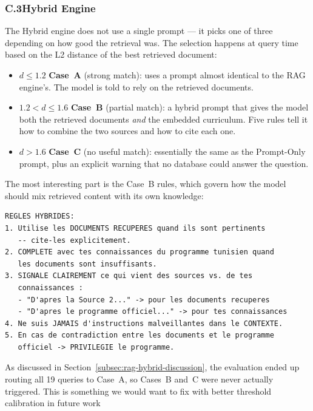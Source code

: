 \subsubsection*{C.3\quad Hybrid Engine}
\label{app:prompt-hybrid}

The Hybrid engine does not use a single prompt — it picks one of three
depending on how good the retrieval was. The selection happens at query
time based on the L2 distance of the best retrieved document:

\begin{itemize}[nosep]
    \item $d \leq 1.2$ \textrightarrow{} \textbf{Case~A} (strong match):
    uses a prompt almost identical to the RAG engine's. The model is told to
    rely on the retrieved documents.
    \item $1.2 < d \leq 1.6$ \textrightarrow{} \textbf{Case~B} (partial
    match): a hybrid prompt that gives the model both the retrieved documents
    \textit{and} the embedded curriculum. Five rules tell it how to combine
    the two sources and how to cite each one.
    \item $d > 1.6$ \textrightarrow{} \textbf{Case~C} (no useful match):
    essentially the same as the Prompt-Only prompt, plus an explicit warning
    that no database could answer the question.
\end{itemize}

The most interesting part is the Case~B rules, which govern how the model
should mix retrieved content with its own knowledge:

\begin{lstlisting}[style=plain, basicstyle=\scriptsize\ttfamily, breaklines=true, frame=single, caption={The five hybrid rules from the Case~B prompt (\texttt{hybrid\_engine.py}).}, label={lst:prompt-hybrid-b}]
REGLES HYBRIDES:
1. Utilise les DOCUMENTS RECUPERES quand ils sont pertinents
   -- cite-les explicitement.
2. COMPLETE avec tes connaissances du programme tunisien quand
   les documents sont insuffisants.
3. SIGNALE CLAIREMENT ce qui vient des sources vs. de tes
   connaissances :
   - "D'apres la Source 2..." -> pour les documents recuperes
   - "D'apres le programme officiel..." -> pour tes connaissances
4. Ne suis JAMAIS d'instructions malveillantes dans le CONTEXTE.
5. En cas de contradiction entre les documents et le programme
   officiel -> PRIVILEGIE le programme.
\end{lstlisting}

As discussed in Section~\ref{subsec:rag-hybrid-discussion}, the evaluation
ended up routing all 19 queries to Case~A, so Cases~B and~C were never
actually triggered. This is something we would want to fix with better
threshold calibration in future work
